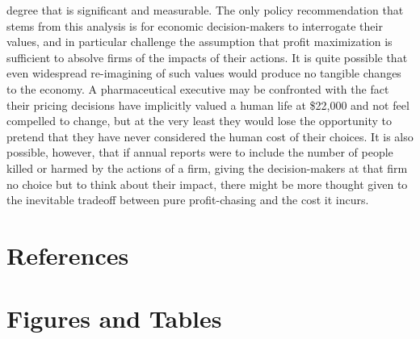 \documentclass[12pt,english]{article} \usepackage{mathptmx}
\begin{document}
degree that is significant and measurable. The only policy 
recommendation that stems from this analysis is for economic 
decision-makers to interrogate their values, and in particular challenge 
the assumption that profit maximization is sufficient to absolve firms 
of the impacts of their actions. It is quite possible that even 
widespread re-imagining of such values would produce no tangible changes 
to the economy. A pharmaceutical executive may be confronted with the 
fact their pricing decisions have implicitly valued a human life at 
\$22,000 and not feel compelled to change, but at the very least they 
would lose the opportunity to pretend that they have never considered 
the human cost of their choices. It is also possible, however, that if 
annual reports were to include the number of people 
killed or harmed by the actions of a firm, giving the decision-makers at 
that firm no choice but to think about their impact, there might be more 
thought given to the inevitable tradeoff between pure profit-chasing and 
the cost it incurs. 
\vfill 
\pagebreak{} 
\clearpage \section*{References}
 
\vfill 
\pagebreak{} 
\clearpage \section*{Figures and Tables} \begin{table}[htp] 
\caption{Drug and Disease Info} \label{Table 1 } \end{table} 
\end{document}
